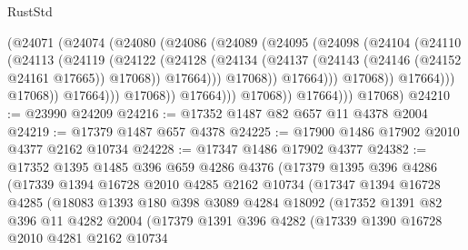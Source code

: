 \begin{lexlean}{RustStd}
\begin{coremodule}
                                  (@24071
                                    (@24074
                                      (@24080
                                        (@24086
                                          (@24089
                                            (@24095
                                              (@24098
                                                (@24104
                                                  (@24110
                                                    (@24113
                                                      (@24119
                                                        (@24122
                                                          (@24128
                                                            (@24134
                                                              (@24137
                                                                (@24143
                                                                  (@24146 (@24152 @24161 @17665))
                                                                  @17068))
                                                              @17664)))
                                                        @17068))
                                                    @17664)))
                                              @17068))
                                          @17664)))
                                    @17068))
                                @17664)))
                          @17068))
                      @17664)))
                @17068))
            @17664)))
      @17068)
@24210 := @23990 @24209
@24216 := @17352 @1487 @82 @657 @11 @4378 @2004
@24219 := @17379 @1487 @657 @4378
@24225 := @17900 @1486 @17902 @2010 @4377 @2162 @10734
@24228 := @17347 @1486 @17902 @4377
@24382 := @17352
    @1395
    @1485
    @396
    @659
    @4286
    @4376
    (@17379
      @1395
      @396
      @4286
      (@17339
        @1394
        @16728
        @2010
        @4285
        @2162
        @10734
        (@17347
          @1394
          @16728
          @4285
          (@18083
            @1393
            @180
            @398
            @3089
            @4284
            @18092
            (@17352
              @1391
              @82
              @396
              @11
              @4282
              @2004
              (@17379
                @1391
                @396
                @4282
                (@17339
                  @1390
                  @16728
                  @2010
                  @4281
                  @2162
                  @10734

\end{coremodule}
\end{lexlean}
